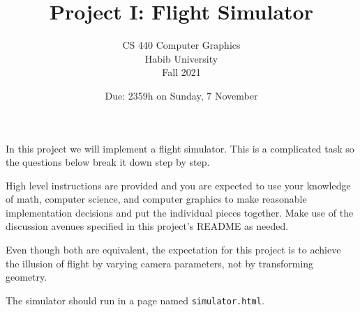 \documentclass[addpoints]{exam}
\title{Project I: Flight Simulator}
\author{CS 440 Computer Graphics\\Habib University\\Fall 2021}
\date{Due: 2359h on Sunday, 7 November}
\begin{document}
\maketitle
\thispagestyle{empty}

In this project we will implement a flight simulator. This is a complicated task so the questions below break it down step by step.

High level instructions are provided and you are expected to use your knowledge of math, computer science, and computer graphics to make reasonable implementation decisions and put the individual pieces together. Make use of the discussion avenues specified in this project's README as needed.

Even though both are equivalent, the expectation for this project is to achieve the illusion of flight by varying camera parameters, not by transforming geometry.

The simulator should run in a page named \texttt{simulator.html}.
\end{document}
